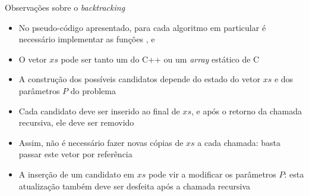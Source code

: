 \begin{frame}[fragile]{Observações sobre o {\it backtracking}}

    \begin{itemize}
        \item No pseudo-código apresentado, para cada algoritmo em particular é necessário
            implementar as funções ,  e

        \item O vetor $xs$ pode ser tanto um  do C++ ou um \textit{array} 
            estático de C

        \item A construção dos possíveis candidatos depende do estado do vetor $xs$ e dos
            parâmetros $P$ do problema

        \item Cada candidato deve ser inserido ao final de $xs$, e após o retorno da chamada
            recursiva, ele deve ser removido

        \item Assim, não é necessário fazer novas cópias de $xs$ a cada chamada: basta passar este
            vetor por referência

        \item A inserção de um candidato em $xs$ pode vir a modificar os parâmetros $P$: esta
            atualização também deve ser desfeita após a chamada recursiva
    \end{itemize}

\end{frame}
